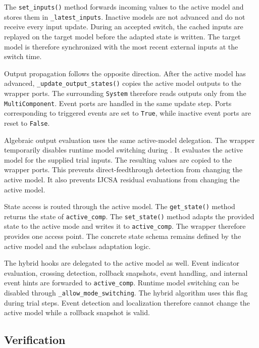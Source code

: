 The \texttt{set\_inputs()} method forwards incoming values to the active model and stores them in \texttt{\_latest\_inputs}.
Inactive models are not advanced and do not receive every input update.
During an accepted switch, the cached inputs are replayed on the target model before the adapted state is written.
The target model is therefore synchronized with the most recent external inputs at the switch time.

Output propagation follows the opposite direction.
After the active model has advanced, \texttt{\_update\_output\_states()} copies the active model outputs to the wrapper ports.
The surrounding \texttt{System} therefore reads outputs only from the \texttt{MultiComponent}.
Event ports are handled in the same update step.
Ports corresponding to triggered events are set to \texttt{True}, while inactive event ports are reset to \texttt{False}.

Algebraic output evaluation uses the same active-model delegation.
The wrapper temporarily disables runtime model switching during .
It evaluates the active model for the supplied trial inputs.
The resulting values are copied to the wrapper ports.
This prevents direct-feedthrough detection from changing the active model.
It also prevents \ac{IJCSA} residual evaluations from changing the active model.

State access is routed through the active model.
The \texttt{get\_state()} method returns the state of \texttt{active\_comp}.
The \texttt{set\_state()} method adapts the provided state to the active mode and writes it to \texttt{active\_comp}.
The wrapper therefore provides one access point.
The concrete state schema remains defined by the active model and the subclass adaptation logic.

The hybrid hooks are delegated to the active model as well.
Event indicator evaluation, crossing detection, rollback snapshots, event handling, and internal event hints are forwarded to \texttt{active\_comp}.
Runtime model switching can be disabled through \texttt{\_allow\_mode\_switching}.
The hybrid algorithm uses this flag during trial steps.
Event detection and localization therefore cannot change the active model while a rollback snapshot is valid.

\subsection{Verification}
\label{sec:impl_multi_model_verification}

